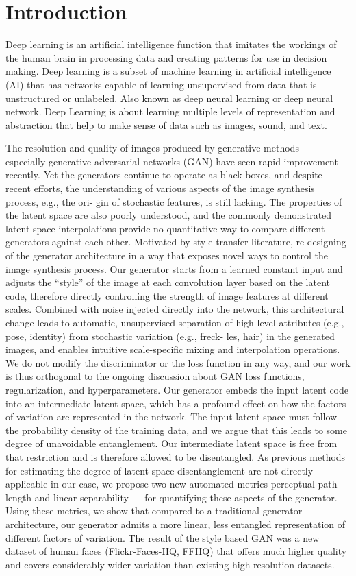 \chapter{Introduction}
Deep learning is an artificial intelligence function that imitates the workings of the human brain in processing data and creating patterns for use in decision making. Deep learning is a subset of machine learning in artificial intelligence (AI) that has networks capable of learning unsupervised from data that is unstructured or unlabeled. Also known as deep neural learning or deep neural network. Deep Learning is about learning multiple levels of representation and abstraction that help to make sense of data such as images, sound, and text.
\par
The resolution and quality of images produced by generative methods — especially generative adversarial networks (GAN)
have seen rapid improvement recently. Yet the generators continue to operate as black
boxes, and despite recent efforts, the understanding of various aspects of the image synthesis process, e.g., the ori-
gin of stochastic features, is still lacking. The properties of
the latent space are also poorly understood, and the commonly demonstrated latent space interpolations provide no quantitative way to compare different generators
against each other.
Motivated by style transfer literature, re-designing of the generator architecture in a way that exposes novel ways to control the image synthesis process. Our generator starts
from a learned constant input and adjusts the “style” of the image at each convolution layer based on the latent code, therefore directly controlling the strength of image
features at different scales. Combined with noise injected directly into the network, this architectural change leads to automatic, unsupervised separation of high-level attributes
(e.g., pose, identity) from stochastic variation (e.g., freck-
les, hair) in the generated images, and enables intuitive
scale-specific mixing and interpolation operations. We do
not modify the discriminator or the loss function in any
way, and our work is thus orthogonal to the ongoing discussion about GAN loss functions, regularization, and hyperparameters.
Our generator embeds the input latent code into an intermediate latent space, which has a profound effect on how the factors of variation are represented in the network. The
input latent space must follow the probability density of the
training data, and we argue that this leads to some degree of
unavoidable entanglement. Our intermediate latent space
is free from that restriction and is therefore allowed to be
disentangled. As previous methods for estimating the degree of latent space disentanglement are not directly applicable in our case, we propose two new automated metrics perceptual path length and linear separability — for quantifying these aspects of the generator. Using these metrics, we
show that compared to a traditional generator architecture,
our generator admits a more linear, less entangled representation of different factors of variation.
The result of the style based GAN was a new dataset of human faces
(Flickr-Faces-HQ, FFHQ) that offers much higher quality and covers considerably wider variation than existing
high-resolution datasets.
